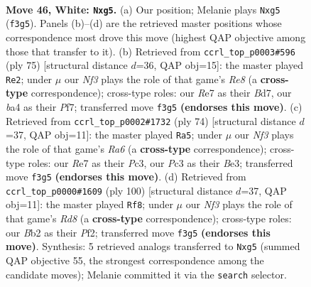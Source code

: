 \documentclass[11pt]{article}
\begin{document}
\clearpage

\begin{figure}[p]\centering
\begin{subfigure}{0.46\textwidth}\centering
\resizebox{\linewidth}{!}{%
\newchessgame
\chessboard[
  setfen={6rk/4R3/8/pp4b1/b1p5/P1P2N2/1B3K2/8 w - - 0 46},
  showmover=false,
  pgfstyle=straightmove, color=movearrow, markmove={f3-g5}
]}
\caption{}
\end{subfigure}\hfill
\begin{subfigure}{0.46\textwidth}\centering
\resizebox{\linewidth}{!}{%
\newchessgame
\chessboard[
  setfen={2k5/3b1p2/8/1p2Pp2/5P2/P1KRB3/2P5/4r3 b - - 11 38},
  showmover=false,
  pgfstyle=straightmove, color=movearrow, markmove={e1-e2}
]}
\caption{}
\end{subfigure}
\\[4pt]
\begin{subfigure}{0.46\textwidth}\centering
\resizebox{\linewidth}{!}{%
\newchessgame
\chessboard[
  setfen={8/3k1pp1/R4b2/1p5r/1P6/2P1B3/2K2P2/8 w - - 16 38},
  showmover=false,
  pgfstyle=straightmove, color=movearrow, markmove={a6-a5}
]}
\caption{}
\end{subfigure}\hfill
\begin{subfigure}{0.46\textwidth}\centering
\resizebox{\linewidth}{!}{%
\newchessgame
\chessboard[
  setfen={3R4/8/p1k5/1p1brp2/1B6/P5P1/5P2/5K2 w - - 2 51},
  showmover=false,
  pgfstyle=straightmove, color=movearrow, markmove={d8-f8}
]}
\caption{}
\end{subfigure}
\caption{\textbf{Move 46, White: \texttt{Nxg5}.} (a) Our position; Melanie plays \texttt{Nxg5} (\texttt{f3g5}). Panels (b)--(d) are the retrieved master positions whose correspondence most drove this move (highest QAP objective among those that transfer to it). (b) Retrieved from \texttt{ccrl\_top\_p0003\#596} (ply 75) [structural distance $d$=36, QAP obj=15]: the master played \texttt{Re2}; under $\mu$ our \emph{Nf3} plays the role of that game's \emph{Re8} (a \textbf{cross-type} correspondence); cross-type roles: our \emph{R}e7 as their \emph{B}d7, our \emph{b}a4 as their \emph{P}f7; transferred move \texttt{f3g5} \textbf{(endorses this move)}. (c) Retrieved from \texttt{ccrl\_top\_p0002\#1732} (ply 74) [structural distance $d$=37, QAP obj=11]: the master played \texttt{Ra5}; under $\mu$ our \emph{Nf3} plays the role of that game's \emph{Ra6} (a \textbf{cross-type} correspondence); cross-type roles: our \emph{R}e7 as their \emph{P}c3, our \emph{P}c3 as their \emph{B}e3; transferred move \texttt{f3g5} \textbf{(endorses this move)}. (d) Retrieved from \texttt{ccrl\_top\_p0000\#1609} (ply 100) [structural distance $d$=37, QAP obj=11]: the master played \texttt{Rf8}; under $\mu$ our \emph{Nf3} plays the role of that game's \emph{Rd8} (a \textbf{cross-type} correspondence); cross-type roles: our \emph{B}b2 as their \emph{P}f2; transferred move \texttt{f3g5} \textbf{(endorses this move)}. Synthesis: 5 retrieved analogs transferred to \texttt{Nxg5} (summed QAP objective 55, the strongest correspondence among the candidate moves); Melanie committed it via the \texttt{search} selector.}
\label{fig:thought-m90}
\end{figure}
\end{document}
